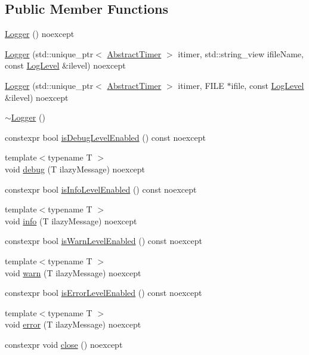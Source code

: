 \subsection*{Public Member Functions}
\begin{DoxyCompactItemize}
\item 
\mbox{\hyperlink{classokapi_1_1Logger_a9a81a6dda1c3cc49e6f103a1496eb2ca}{Logger}} () noexcept
\item 
\mbox{\hyperlink{classokapi_1_1Logger_aca21f246a76dd95b6664332407d8279e}{Logger}} (std\+::unique\+\_\+ptr$<$ \mbox{\hyperlink{classokapi_1_1AbstractTimer}{Abstract\+Timer}} $>$ itimer, std\+::string\+\_\+view ifile\+Name, const \mbox{\hyperlink{classokapi_1_1Logger_a66826a92c568743a2722d3c3f6887d81}{Log\+Level}} \&ilevel) noexcept
\item 
\mbox{\hyperlink{classokapi_1_1Logger_ad23bb773b75860507dd4ab8cd67d8d51}{Logger}} (std\+::unique\+\_\+ptr$<$ \mbox{\hyperlink{classokapi_1_1AbstractTimer}{Abstract\+Timer}} $>$ itimer, F\+I\+LE $\ast$ifile, const \mbox{\hyperlink{classokapi_1_1Logger_a66826a92c568743a2722d3c3f6887d81}{Log\+Level}} \&ilevel) noexcept
\item 
\mbox{\hyperlink{classokapi_1_1Logger_aa73eef76e53a36ce17f1bd8897352d6e}{$\sim$\+Logger}} ()
\item 
constexpr bool \mbox{\hyperlink{classokapi_1_1Logger_ac690892e7119bd42d2db074cafa51faf}{is\+Debug\+Level\+Enabled}} () const noexcept
\item 
{\footnotesize template$<$typename T $>$ }\\void \mbox{\hyperlink{classokapi_1_1Logger_a66cb0a59dbadc76f82b093bf99002bce}{debug}} (T ilazy\+Message) noexcept
\item 
constexpr bool \mbox{\hyperlink{classokapi_1_1Logger_ad796cc10a1526e8f6ee0c0e46180f616}{is\+Info\+Level\+Enabled}} () const noexcept
\item 
{\footnotesize template$<$typename T $>$ }\\void \mbox{\hyperlink{classokapi_1_1Logger_a8db954232f9c2a5cbd57dbf50c9ce1d3}{info}} (T ilazy\+Message) noexcept
\item 
constexpr bool \mbox{\hyperlink{classokapi_1_1Logger_a7a8511d6ab38c6d661d29c1dfcf7ac1d}{is\+Warn\+Level\+Enabled}} () const noexcept
\item 
{\footnotesize template$<$typename T $>$ }\\void \mbox{\hyperlink{classokapi_1_1Logger_a46199a0d137b7bd237a70ca5da2da14c}{warn}} (T ilazy\+Message) noexcept
\item 
constexpr bool \mbox{\hyperlink{classokapi_1_1Logger_a1fe2a16dc905d576a32a74186d08e346}{is\+Error\+Level\+Enabled}} () const noexcept
\item 
{\footnotesize template$<$typename T $>$ }\\void \mbox{\hyperlink{classokapi_1_1Logger_a9be5bbf6b6e90265b37a955bebba4387}{error}} (T ilazy\+Message) noexcept
\item 
constexpr void \mbox{\hyperlink{classokapi_1_1Logger_a15f8ef2e95e376c59c5f556bab2bd38a}{close}} () noexcept
\end{DoxyCompactItemize}
